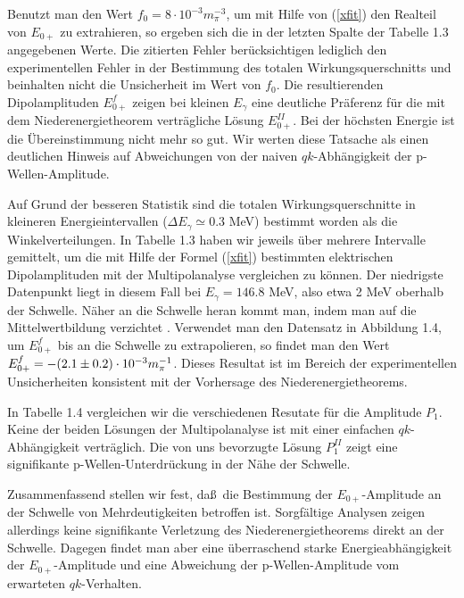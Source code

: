 Benutzt man den Wert $f_0=8\cdot 10^{-3}m_\pi^{-3}$, um mit Hilfe von 
(\ref{xfit}) den Realteil von $E_{0+}$ zu extrahieren, so ergeben sich die 
in der letzten Spalte der Tabelle 1.3 angegebenen Werte. Die zitierten
Fehler ber\"ucksichtigen lediglich den experimentellen Fehler in der
Bestimmung des totalen Wirkungsquerschnitts und beinhalten nicht die 
Unsicherheit im Wert von $f_0$. Die resultierenden Dipolamplituden $E_{0+}^f$
zeigen bei kleinen $E_\gamma$ eine deutliche Pr\"aferenz f\"ur die 
mit dem Niederenergietheorem vertr\"agliche L\"osung $E_{0+}^{II}$. 
Bei der h\"ochsten Energie ist die \"Ubereinstimmung nicht mehr 
so gut. Wir werten diese Tatsache als einen deutlichen Hinweis auf 
Abweichungen von der naiven $qk$-Abh\"angigkeit der p-Wellen-Amplitude. 

Auf Grund der besseren Statistik sind die totalen Wirkungsquerschnitte
in kleineren Energieintervallen ($\Delta E_\gamma \simeq 0.3$ MeV)
bestimmt worden als die Winkelverteilungen. In Tabelle 1.3 haben wir 
jeweils \"uber mehrere Intervalle gemittelt, um die mit Hilfe der 
Formel (\ref{xfit}) bestimmten elektrischen Dipolamplituden  
mit der Multipolanalyse vergleichen zu k\"onnen. Der niedrigste Datenpunkt
liegt in diesem Fall bei $E_\gamma = 146.8$ MeV, also etwa 2 MeV 
oberhalb der Schwelle. N\"aher an die Schwelle heran kommt man, indem
man auf die Mittelwertbildung verzichtet \cite{Ber91}.
Verwendet man den  Datensatz in  Abbildung 1.4, um $E_{0+}^f$ bis an die 
Schwelle zu  extrapolieren, so findet man den Wert $E_{0+}^f =-(2.1\pm 0.2) 
\cdot 10^{-3} m_\pi^{-1}$. Dieses Resultat ist im Bereich der experimentellen Unsicherheiten
konsistent mit der Vorhersage des Niederenergietheorems.   

In Tabelle 1.4 vergleichen wir die verschiedenen Resutate 
f\"ur die Amplitude $P_1$. Keine der beiden L\"osungen der
Multipolanalyse ist mit einer einfachen $qk$-Abh\"angigkeit
ver\-tr\"ag\-lich. Die von uns bevorzugte L\"osung $P_1^{II}$ zeigt
eine signifikante p-Wellen-Unterdr\"uckung in der N\"ahe der
Schwelle.

Zusammenfassend stellen wir fest, da\ss\ die Bestimmung der 
$E_{0+}$-Am\-pli\-tu\-de an der Schwel\-le von Mehrdeutigkeiten betroffen 
ist. Sorgf\"altige Analysen zeigen allerdings keine signifikante Verletzung
des Niederenergietheorems direkt an der Schwelle. 
Dagegen findet man aber eine \"uberraschend starke
Energieabh\"angigkeit der $E_{0+}$-Amplitude und eine Abweichung
der p-Wellen-Amplitude vom erwarteten $qk$-Verhalten.

